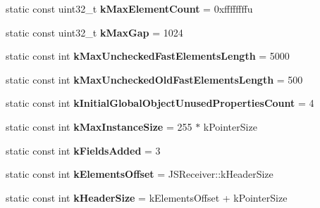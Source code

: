 \begin{DoxyCompactItemize}
\item 
static const uint32\+\_\+t {\bfseries k\+Max\+Element\+Count} = 0xffffffffu\hypertarget{classv8_1_1internal_1_1_j_s_object_a94879143e109d2b4105523b69de660a1}{}\label{classv8_1_1internal_1_1_j_s_object_a94879143e109d2b4105523b69de660a1}

\item 
static const uint32\+\_\+t {\bfseries k\+Max\+Gap} = 1024\hypertarget{classv8_1_1internal_1_1_j_s_object_a920eb1a5c2f03a3ca10ef3fcc5ac42fe}{}\label{classv8_1_1internal_1_1_j_s_object_a920eb1a5c2f03a3ca10ef3fcc5ac42fe}

\item 
static const int {\bfseries k\+Max\+Unchecked\+Fast\+Elements\+Length} = 5000\hypertarget{classv8_1_1internal_1_1_j_s_object_abb22b3e9cd78800bced6ef8dd68447ce}{}\label{classv8_1_1internal_1_1_j_s_object_abb22b3e9cd78800bced6ef8dd68447ce}

\item 
static const int {\bfseries k\+Max\+Unchecked\+Old\+Fast\+Elements\+Length} = 500\hypertarget{classv8_1_1internal_1_1_j_s_object_af317066946eb7d04f0af04c0b1d69d93}{}\label{classv8_1_1internal_1_1_j_s_object_af317066946eb7d04f0af04c0b1d69d93}

\item 
static const int {\bfseries k\+Initial\+Global\+Object\+Unused\+Properties\+Count} = 4\hypertarget{classv8_1_1internal_1_1_j_s_object_a7f5244c394b225cd572a03cb68ee22c2}{}\label{classv8_1_1internal_1_1_j_s_object_a7f5244c394b225cd572a03cb68ee22c2}

\item 
static const int {\bfseries k\+Max\+Instance\+Size} = 255 $\ast$ k\+Pointer\+Size\hypertarget{classv8_1_1internal_1_1_j_s_object_a3d270856f8e8f80f2a80c0c37bda1c23}{}\label{classv8_1_1internal_1_1_j_s_object_a3d270856f8e8f80f2a80c0c37bda1c23}

\item 
static const int {\bfseries k\+Fields\+Added} = 3\hypertarget{classv8_1_1internal_1_1_j_s_object_a29b37dbc6571c3318647807794a433c8}{}\label{classv8_1_1internal_1_1_j_s_object_a29b37dbc6571c3318647807794a433c8}

\item 
static const int {\bfseries k\+Elements\+Offset} = J\+S\+Receiver\+::k\+Header\+Size\hypertarget{classv8_1_1internal_1_1_j_s_object_adbdc81f5aec6d4defbcc3099b17f5142}{}\label{classv8_1_1internal_1_1_j_s_object_adbdc81f5aec6d4defbcc3099b17f5142}

\item 
static const int {\bfseries k\+Header\+Size} = k\+Elements\+Offset + k\+Pointer\+Size\hypertarget{classv8_1_1internal_1_1_j_s_object_a5ba6da4d81bc33d61cafa6a5b3f1e619}{}\label{classv8_1_1internal_1_1_j_s_object_a5ba6da4d81bc33d61cafa6a5b3f1e619}

\end{DoxyCompactItemize}
